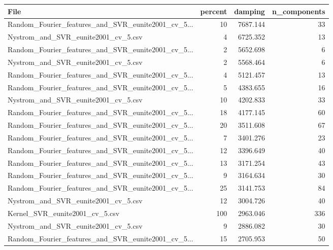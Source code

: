 \begin{tabularx}{\textwidth}{lrrr}
\toprule
                                              File &  percent &   damping &  n\_components \\
\midrule
Random\_Fourier\_features\_and\_SVR\_eunite2001\_cv\_5... &       10 &  7687.144 &            33 \\
               Nystrom\_and\_SVR\_eunite2001\_cv\_5.csv &        4 &  6725.352 &            13 \\
Random\_Fourier\_features\_and\_SVR\_eunite2001\_cv\_5... &        2 &  5652.698 &             6 \\
               Nystrom\_and\_SVR\_eunite2001\_cv\_5.csv &        2 &  5568.464 &             6 \\
Random\_Fourier\_features\_and\_SVR\_eunite2001\_cv\_5... &        4 &  5121.457 &            13 \\
Random\_Fourier\_features\_and\_SVR\_eunite2001\_cv\_5... &        5 &  4383.655 &            16 \\
               Nystrom\_and\_SVR\_eunite2001\_cv\_5.csv &       10 &  4202.833 &            33 \\
Random\_Fourier\_features\_and\_SVR\_eunite2001\_cv\_5... &       18 &  4177.145 &            60 \\
Random\_Fourier\_features\_and\_SVR\_eunite2001\_cv\_5... &       20 &  3511.608 &            67 \\
Random\_Fourier\_features\_and\_SVR\_eunite2001\_cv\_5... &        7 &  3401.276 &            23 \\
Random\_Fourier\_features\_and\_SVR\_eunite2001\_cv\_5... &       12 &  3396.649 &            40 \\
Random\_Fourier\_features\_and\_SVR\_eunite2001\_cv\_5... &       13 &  3171.254 &            43 \\
Random\_Fourier\_features\_and\_SVR\_eunite2001\_cv\_5... &        9 &  3164.634 &            30 \\
Random\_Fourier\_features\_and\_SVR\_eunite2001\_cv\_5... &       25 &  3141.753 &            84 \\
               Nystrom\_and\_SVR\_eunite2001\_cv\_5.csv &       12 &  3004.726 &            40 \\
                    Kernel\_SVR\_eunite2001\_cv\_5.csv &      100 &  2963.046 &           336 \\
               Nystrom\_and\_SVR\_eunite2001\_cv\_5.csv &        9 &  2886.082 &            30 \\
Random\_Fourier\_features\_and\_SVR\_eunite2001\_cv\_5... &       15 &  2705.953 &            50 \\

\end{tabularx}
